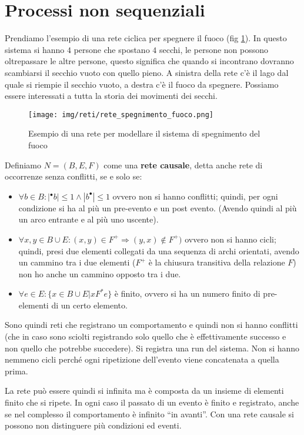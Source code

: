 \section{Processi non sequenziali}
Prendiamo l'esempio di una rete ciclica per spegnere il fuoco (fig \ref{fig:spegnimento-fuoco}).
In questo sistema si hanno $4$ persone che spostano $4$ secchi, le persone non possono
oltrepassare le altre persone, questo significa che quando si incontrano dovranno
scambiarsi il secchio vuoto con quello pieno. A sinistra della rete c'è il lago dal quale
si riempie il secchio vuoto, a destra c'è il fuoco da spegnere. Possiamo essere
interessati a tutta la storia dei movimenti dei secchi.
\begin{figure}[!ht]
    \centering
    \texttt{[image: img/reti/rete\_spegnimento\_fuoco.png]}
    \caption{Esempio di una rete per modellare il sistema di spegnimento del fuoco}
    \label{fig:spegnimento-fuoco}
\end{figure}
\begin{definizione}
    Definiamo $N = (B,E, F)$ come una \textbf{rete causale}, detta anche rete di
    occorrenze senza conflitti, se e solo se:
    \begin{itemize}
        \item $\forall b \in B: |^{\bullet}b| \leq 1 \land |b^{\bullet}| \leq 1$
              ovvero non si hanno conflitti; quindi, per ogni condizione si ha al più
              un pre-evento e un post evento. (Avendo quindi al più un arco entrante
              e al più uno uscente).
        \item $\forall x, y \in B \cup E: (x, y) \in F^{+} \Rightarrow (y, x) \notin F^{+})$
              ovvero non si hanno cicli; quindi, presi due elementi collegati da una
              sequenza di archi orientati, avendo un cammino tra i due elementi ($F^{+}$
              è la chiusura transitiva della relazione $F$) non ho anche un cammino
              opposto tra i due.
        \item $\forall e \in E: \{x \in B \cup E | xF^{\ast}e\}$ è finito, ovvero
              si ha un numero finito di pre-elementi di un certo elemento.
    \end{itemize}
    Sono quindi reti che registrano un comportamento e quindi non si hanno
    conflitti (che in caso sono sciolti registrando solo quello che è effettivamente
    successo e non quello che potrebbe succedere). Si registra una run del sistema.
    Non si hanno nemmeno cicli perché ogni ripetizione dell'evento viene concatenata
    a quella prima.

    La rete può essere quindi si infinita ma è composta da un insieme di elementi
    finito che si ripete. In ogni caso il passato di un evento è finito e registrato,
    anche se nel complesso il comportamento è infinito “in avanti”. Con una rete
    causale si possono non distinguere più condizioni ed eventi.
\end{definizione}

